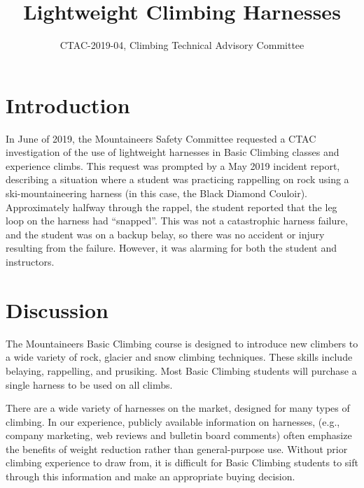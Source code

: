 \documentclass[nonacm,acmtog]{acmart}
\title{Lightweight Climbing Harnesses}
\subtitle{CTAC-2019-04, Climbing Technical Advisory Committee}
\begin{document}
\maketitle


\section{Introduction}
\label{sec:intro}

  In June of 2019, the Mountaineers Safety Committee requested a CTAC
  investigation of the use of lightweight harnesses in Basic Climbing classes
  and experience climbs.  This request was prompted by a May 2019 incident
  report, describing a situation where a student was practicing rappelling on
  rock using a ski-mountaineering harness (in this case, the Black Diamond
  Couloir).  Approximately halfway through the rappel, the student reported
  that the leg loop on the harness had ``snapped''. This was not a catastrophic
  harness failure, and the student was on a backup belay, so there was no
  accident or injury resulting from the failure.  However, it was alarming for
  both the student and instructors.


\section{Discussion}
\label{sec:discuss}

  The Mountaineers Basic Climbing course is designed to introduce new climbers
  to a wide variety of rock, glacier and snow climbing techniques. These skills
  include belaying, rappelling, and prusiking.  Most Basic Climbing students
  will purchase a single harness to be used on all climbs.

  There are a wide variety of harnesses on the market, designed for many types
  of climbing.  In our experience, publicly available information on harnesses,
  (e.g., company marketing, web reviews and bulletin board comments) often
  emphasize the benefits of weight reduction rather than general-purpose use.
  Without prior climbing experience to draw from, it is difficult for Basic
  Climbing students to sift through this information and make an appropriate
  buying decision.
\end{document}
